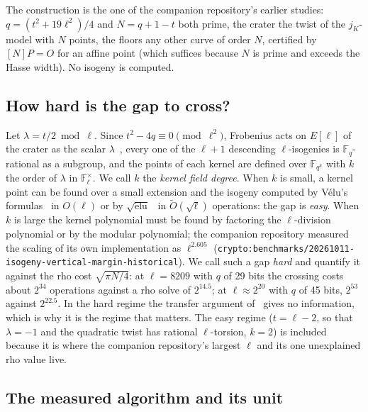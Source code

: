 \documentclass[10pt,a4paper]{article}
\newcommand{\FF}{\mathbb{F}}
\newcommand{\artefact}[1]{\texttt{\small #1}}
\theoremstyle{remark}
\begin{document}
The construction is the one of the companion repository's earlier
studies: $q = (t^2 + 19\ell^2)/4$ and $N = q + 1 - t$ both prime, the
crater the twist of the $j_K$-model with $N$ points, the floors any other
curve of order $N$, certified by $[N]P = O$ for an affine point (which
suffices because $N$ is prime and exceeds the Hasse width). No isogeny is
computed.

\subsection{How hard is the gap to cross?}

Let $\lambda = t/2 \bmod \ell$. Since $t^2 - 4q \equiv 0 \pmod{\ell^2}$,
Frobenius acts on $E[\ell]$ of the crater as the scalar
$\lambda$~\cite{Lenstra1996}, every one of the $\ell + 1$ descending
$\ell$-isogenies is $\FF_q$-rational as a subgroup, and the points of each
kernel are defined over $\FF_{q^k}$ with $k$ the order of $\lambda$ in
$\FF_\ell^\times$. We call $k$ the \emph{kernel field degree}. When $k$
is small, a kernel point can be found over a small extension and the
isogeny computed by V\'elu's formulas~\cite{Velu1971} in $O(\ell)$ or by
$\sqrt{\mathrm{\acute e lu}}$~\cite{BDLS2020} in $\tilde O(\sqrt\ell)$
operations: the gap is \emph{easy}. When $k$ is large the kernel
polynomial must be found by factoring the $\ell$-division polynomial or
by the modular polynomial; the companion repository measured the
scaling of its own implementation as $\ell^{2.605}$
(\artefact{crypto:benchmarks/20261011-isogeny-vertical-margin-historical}).
We call such a gap \emph{hard} and quantify it against the rho cost
$\sqrt{\pi N / 4}$: at $\ell = 8209$ with $q$ of 29 bits the crossing
costs about $2^{34}$ operations against a rho solve of $2^{14.5}$; at
$\ell \approx 2^{20}$ with $q$ of 45 bits, $2^{53}$ against $2^{22.5}$.
In the hard regime the transfer argument of~\cite{JMV2005} gives no
information, which is why it is the regime that matters. The easy regime
($t = \ell - 2$, so that $\lambda = -1$ and the quadratic twist has
rational $\ell$-torsion, $k = 2$) is included because it is where the
companion repository's largest $\ell$ and its one unexplained rho value
live.

\subsection{The measured algorithm and its unit}
\end{document}
